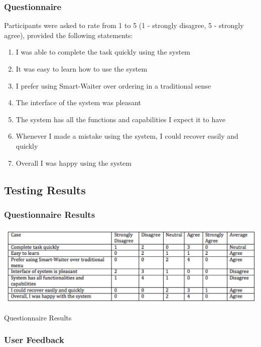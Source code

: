 \documentclass[12pt, titlepage]{article}
\begin{document}
\subsubsection{Questionnaire}
Participants were asked to rate from 1 to 5 (1 - strongly disagree, 5 - strongly agree), provided the following statements: 
\begin{enumerate}
\item  I was able to complete the task quickly using the system
\item It was easy to learn how to use the system
\item I prefer using Smart-Waiter over ordering in a traditional sense
\item The interface of the system was pleasant
\item The system has all the functions and capabilities I expect it to have
\item Whenever I made a mistake using the system, I could recover easily and quickly
\item Overall I was happy using the system
\end{enumerate} 

\subsection{Testing Results} 

\subsubsection{Questionnaire Results}
\break
\begin{table}[h]
\includegraphics[width=1.2\textwidth]{usabilityResults.png}
  \caption{Questionnaire Results}
\end{table}

\subsubsection{User Feedback}
\end{document}
